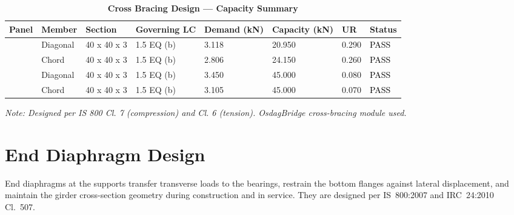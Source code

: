 \documentclass[12pt,a4paper]{report}
\numberwithin{table}{chapter}
\numberwithin{figure}{chapter}
\begin{document}
\vspace{1em}
\begin{longtable}{|C{2.0cm}|L{1.8cm}|C{2.2cm}|C{3.0cm}|C{1.8cm}|C{1.8cm}|C{1.2cm}|C{1.8cm}|}
\caption{\textbf{Cross Bracing Design --- Capacity Summary}}
\hline
\textbf{Panel} & \textbf{Member} & \textbf{Section} & \textbf{Governing LC} & \textbf{Demand (kN)} & \textbf{Capacity (kN)} & \textbf{UR} & \textbf{Status} \\[6pt]
\hline
{} & Diagonal & 40 x 40 x 3 & 1.5 EQ (b) & 3.118 & 20.950 & 0.290 & \textcolor{black}{PASS} \\[6pt]
 & Chord & 40 x 40 x 3 & 1.5 EQ (b) & 2.806 & 24.150 & 0.260 & \textcolor{black}{PASS} \\[6pt]
\hline
{} & Diagonal & 40 x 40 x 3 & 1.5 EQ (b) & 3.450 & 45.000 & 0.080 & \textcolor{black}{PASS} \\[6pt]
 & Chord & 40 x 40 x 3 & 1.5 EQ (b) & 3.105 & 45.000 & 0.070 & \textcolor{black}{PASS} \\[6pt]
\hline
\end{longtable}
\noindent\textit{Note: Designed per IS 800 Cl. 7 (compression) and Cl. 6 (tension). OsdagBridge cross-bracing module used.}

\section{End Diaphragm Design}
\label{sec:end-diaphragm}

End diaphragms at the supports transfer transverse loads to the bearings, restrain the bottom flanges against lateral displacement, and maintain the girder cross-section geometry during construction and in service. They are designed per IS~800:2007 and IRC~24:2010 Cl.~507.

\vspace{1em}

\vspace{0.4em}
\noindent
\setlength{\tabcolsep}{4pt}
\setlength{\LTleft}{0pt}
\setlength{\LTright}{\fill}
\end{document}
